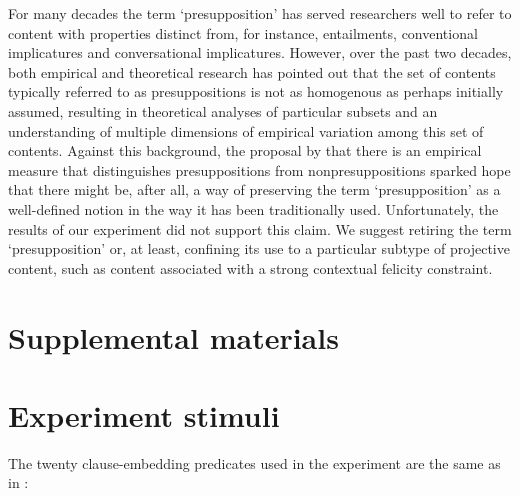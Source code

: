 \documentclass[11pt,fleqn]{article}
\newcommand{\6}{\mbox{$[\hspace*{-.6mm}[$}}
\newcommand{\9}{\mbox{$]\hspace*{-.6mm}]$}}
\begin{document}
For many decades the term `presupposition' has served researchers well to refer to content with properties distinct from, for instance, entailments, conventional implicatures and conversational implicatures. However, over the past two decades, both empirical and theoretical research has pointed out that the set of contents typically referred to as presuppositions is not as homogenous as perhaps initially assumed, resulting in theoretical analyses of particular subsets and an understanding of multiple dimensions of empirical variation among this set of contents. Against this background, the proposal by \citealt{mandelkern-etal2020} that there is an empirical measure that distinguishes presuppositions from nonpresuppositions sparked hope that there might be, after all, a way of preserving the term `presupposition' as a well-defined notion in the way it has been traditionally used.  Unfortunately, the results of our experiment did not support this claim. We suggest retiring the term `presupposition' or, at least, confining its use to a particular subtype of projective content, such as content associated with a strong contextual felicity constraint.



%


\newpage

\section*{Supplemental materials}

\appendix

\setcounter{page}{1}

\setcounter{table}{0}
\renewcommand{\thetable}{A\arabic{table}}

\setcounter{figure}{0}
\renewcommand{\thefigure}{A\arabic{figure}}

\section{Experiment stimuli}\label{a:clauses}

The twenty clause-embedding predicates used in the experiment are the same as in \citealt{degen-tonhauser-openmind,degen-tonhauser-language}:
\end{document}
